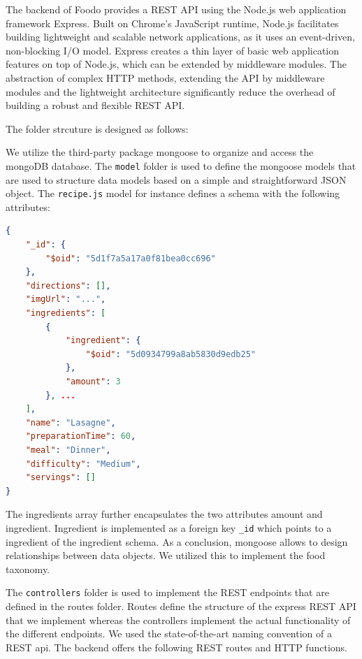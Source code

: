 The backend of Foodo provides a REST API using the Node.js web application framework Express. Built on Chrome's JavaScript runtime, Node.js facilitates building lightweight and scalable network applications, as it uses an event-driven, non-blocking I/O model. Express creates a thin layer of basic web application features on top of Node.js, which can be extended by middleware modules. The abstraction of complex HTTP methods, extending the API by middleware modules and the lightweight architecture significantly reduce the overhead of building a robust and flexible REST API.


The folder strcuture is designed as follows:
\vspace{1em}

We utilize the third-party package mongoose to organize and access the mongoDB database. The \texttt{model} folder is used to define the mongoose models that are used to structure data models based on a simple and straightforward JSON object. The \texttt{recipe.js} model for instance defines a schema with the following attributes:

\begin{lstlisting}[language=json,firstnumber=1,caption={Example of recipe "Lasagne"},captionpos=b]
{
	"_id": {
		"$oid": "5d1f7a5a17a0f81bea0cc696"
	},
	"directions": [],
	"imgUrl": "...",
	"ingredients": [
		{
			"ingredient": {
				"$oid": "5d0934799a8ab5830d9edb25"
			},
			"amount": 3
		}, ...
	],
	"name": "Lasagne",
	"preparationTime": 60,
	"meal": "Dinner",
	"difficulty": "Medium",
	"servings": []
}
\end{lstlisting}

The ingredients array further encapsulates the two attributes amount and ingredient. Ingredient is implemented as a foreign key \texttt{\_id} which points to a ingredient of the ingredient schema. As a conclusion, mongoose allows to design relationships between data objects. We utilized this to implement the food taxonomy. 

The \texttt{controllers} folder is used to implement the REST endpoints that are defined in the routes folder. Routes define the structure of the express REST API that we implement whereas the controllers implement the actual functionality of the different endpoints. We used the state-of-the-art naming convention of a REST api. The backend offers the following REST routes and HTTP functions.

